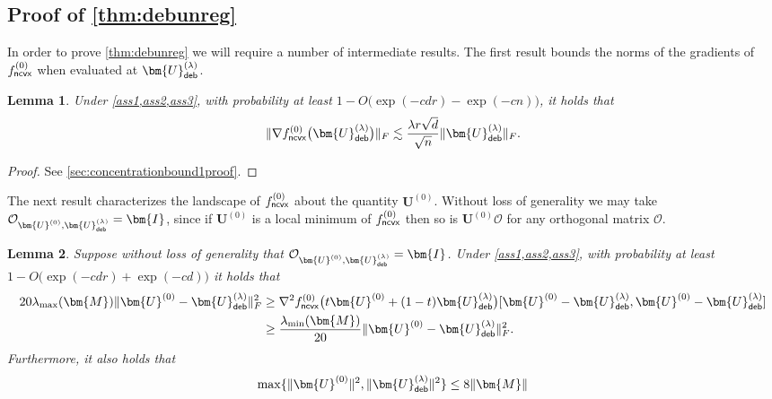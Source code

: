 \documentclass[10pt]{article}
\newtheorem{lemma}{Lemma}
\theoremstyle{definition}
\begin{document}
\subsection{Proof of \cref{thm:debunreg}}
In order to prove \cref{thm:debunreg} we will require a number of intermediate results.  The first result bounds the norms of the gradients of $f^{(0)}_{{\sf ncvx}}$ when evaluated at $\bm{U}_{{\sf deb}}^{(\lambda)}$. 
\begin{lemma}\label{lem:concentrationbound1} Under \cref{ass1,ass2,ass3}, with probability at least $1 - O\bigg(  \exp( -c  d r) -  \exp( - c n ) \bigg)$, it holds that
    \begin{align}
        \| \nabla f^{(0)}_{{\sf ncvx}} \big( \bm{U}^{(\lambda)}_{{\sf deb}} \big) \|_F \lesssim \frac{\lambda r \sqrt{d}}{\sqrt{n}} \| \bm{U}^{(\lambda)}_{{\sf deb}} \|_F.
    \end{align}
\end{lemma}

\begin{proof}
    See \cref{sec:concentrationbound1proof}.
\end{proof}


The next result characterizes the landscape of $f^{(0)}_{{\sf ncvx}}$ about the quantity $\bm{U}^{(0)}$. Without loss of generality we may take $ \mathcal{O}_{\bm{U}^{(0)},\bm{U}_{{\sf deb}}^{(\lambda)}} = \bm{I}$, since if $\bm{U}^{(0)}$ is a local minimum of $f^{(0)}_{{\sf ncvx}}$ then so is $\bm{U}^{(0)} \mathcal{O}$ for any orthogonal matrix $\mathcal{O}$.
\begin{lemma}\label{lem:convexity} Suppose without loss of generality that 
$ \mathcal{O}_{\bm{U}^{(0)},\bm{U}_{{\sf deb}}^{(\lambda)}} = \bm{I}$. Under \cref{ass1,ass2,ass3}, with probability at least $1 - O\big( \exp( - c dr ) + \exp( - c d) \big)$ it holds that
\begin{align}
    20 \lambda_{\max}(\bm{M}) \| \bm{U}^{(0)} - \bm{U}^{(\lambda)}_{{\sf deb}} \|_F^2  &\geq \nabla^2 f^{(0)}_{{\sf ncvx}}\big( t \bm{U}^{(0)} + (1 - t) \bm{U}^{(\lambda)}_{{\sf deb}} \big)[\bm{U}^{(0)} - \bm{U}_{{\sf deb}}^{(\lambda)} ,\bm{U}^{(0)} - \bm{U}_{{\sf deb}}^{(\lambda)}] \\
    &\geq \frac{\lambda_{\min}(\bm{M})}{20} \| \bm{U}^{(0)} - \bm{U}^{(\lambda)}_{{\sf deb}} \|_F^2.
\end{align}
Furthermore, it also holds that
\begin{align}
    \max\{ \| \bm{U}^{(0)}\|^2, \| \bm{U}_{{\sf deb}}^{(\lambda)} \|^2 \} \leq 8 \| \bm{M} \|
\end{align}
\end{lemma}
\end{document}
